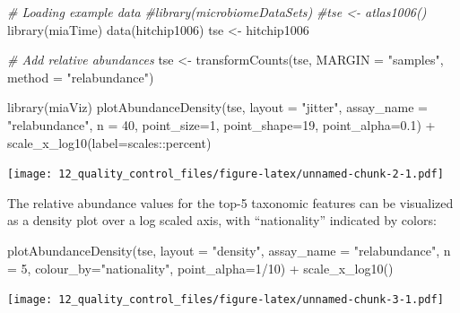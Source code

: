 \documentclass[
]{book}
\newenvironment{Shaded}{\begin{snugshade}}{\end{snugshade}}
\newcommand{\AttributeTok}[1]{\textcolor[rgb]{0.77,0.63,0.00}{#1}}
\newcommand{\CommentTok}[1]{\textcolor[rgb]{0.56,0.35,0.01}{\textit{#1}}}
\newcommand{\DecValTok}[1]{\textcolor[rgb]{0.00,0.00,0.81}{#1}}
\newcommand{\FloatTok}[1]{\textcolor[rgb]{0.00,0.00,0.81}{#1}}
\newcommand{\FunctionTok}[1]{\textcolor[rgb]{0.00,0.00,0.00}{#1}}
\newcommand{\NormalTok}[1]{#1}
\newcommand{\OtherTok}[1]{\textcolor[rgb]{0.56,0.35,0.01}{#1}}
\newcommand{\SpecialCharTok}[1]{\textcolor[rgb]{0.00,0.00,0.00}{#1}}
\newcommand{\StringTok}[1]{\textcolor[rgb]{0.31,0.60,0.02}{#1}}
\begin{document}
\begin{Shaded}
\begin{Highlighting}[]
\CommentTok{\# Loading example data}
\CommentTok{\#library(microbiomeDataSets)}
\CommentTok{\#tse \textless{}{-} atlas1006()}
\FunctionTok{library}\NormalTok{(miaTime)}
\FunctionTok{data}\NormalTok{(hitchip1006)}
\NormalTok{tse }\OtherTok{\textless{}{-}}\NormalTok{ hitchip1006}

\CommentTok{\# Add relative abundances}
\NormalTok{tse }\OtherTok{\textless{}{-}} \FunctionTok{transformCounts}\NormalTok{(tse, }\AttributeTok{MARGIN =} \StringTok{"samples"}\NormalTok{, }\AttributeTok{method =} \StringTok{"relabundance"}\NormalTok{)}

\FunctionTok{library}\NormalTok{(miaViz)}
\FunctionTok{plotAbundanceDensity}\NormalTok{(tse, }\AttributeTok{layout =} \StringTok{"jitter"}\NormalTok{, }\AttributeTok{assay\_name =} \StringTok{"relabundance"}\NormalTok{,}
                     \AttributeTok{n =} \DecValTok{40}\NormalTok{, }\AttributeTok{point\_size=}\DecValTok{1}\NormalTok{, }\AttributeTok{point\_shape=}\DecValTok{19}\NormalTok{, }\AttributeTok{point\_alpha=}\FloatTok{0.1}\NormalTok{) }\SpecialCharTok{+} 
    \FunctionTok{scale\_x\_log10}\NormalTok{(}\AttributeTok{label=}\NormalTok{scales}\SpecialCharTok{::}\NormalTok{percent)}
\end{Highlighting}
\end{Shaded}

\texttt{[image: 12\_quality\_control\_files/figure-latex/unnamed-chunk-2-1.pdf]}

The relative abundance values for the top-5 taxonomic features can be
visualized as a density plot over a log scaled axis, with
``nationality'' indicated by colors:

\begin{Shaded}
\begin{Highlighting}[]
\FunctionTok{plotAbundanceDensity}\NormalTok{(tse, }\AttributeTok{layout =} \StringTok{"density"}\NormalTok{, }\AttributeTok{assay\_name =} \StringTok{"relabundance"}\NormalTok{,}
                     \AttributeTok{n =} \DecValTok{5}\NormalTok{, }\AttributeTok{colour\_by=}\StringTok{"nationality"}\NormalTok{, }\AttributeTok{point\_alpha=}\DecValTok{1}\SpecialCharTok{/}\DecValTok{10}\NormalTok{) }\SpecialCharTok{+}
    \FunctionTok{scale\_x\_log10}\NormalTok{()}
\end{Highlighting}
\end{Shaded}

\texttt{[image: 12\_quality\_control\_files/figure-latex/unnamed-chunk-3-1.pdf]}
\end{document}
